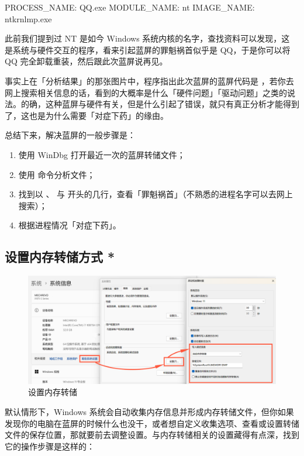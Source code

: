 \begin{MissingVerbatim}
PROCESS_NAME:  QQ.exe
MODULE_NAME: nt
IMAGE_NAME:  ntkrnlmp.exe
\end{MissingVerbatim}

此前我们提到过 NT 是如今 Windows 系统内核的名字，查找资料可以发现，这  是系统与硬件交互的程序，看来引起蓝屏的罪魁祸首似乎是 QQ，于是你可以将 QQ 完全卸载重装，然后跟此次蓝屏说再见。

事实上在「分析结果」的那张图片中，程序指出此次蓝屏的蓝屏代码是 ，若你去网上搜索相关信息的话，看到的大概率是什么「硬件问题」「驱动问题」之类的说法。的确，这种蓝屏与硬件有关，但是什么引起了错误，就只有真正分析才能得到了，这也是为什么需要「对症下药」的缘由。

总结下来，解决蓝屏的一般步骤是：

\begin{enumerate}
  \item 使用 WinDbg 打开最近一次的蓝屏转储文件；
  \item 使用  命令分析文件；
  \item 找到以 、 与  开头的几行，查看「罪魁祸首」（不熟悉的进程名字可以去网上搜索）；
  \item 根据进程情况「对症下药」。
\end{enumerate}

\subsection{设置内存转储方式 *}

\begin{figure}[htb!]
  \centering
  \includegraphics[width=.95\textwidth]{assets/advanced/Dump_Settings.png}
  \caption{设置内存转储}
  \label{fig:Dump_Settings}
\end{figure}

默认情形下，Windows 系统会自动收集内存信息并形成内存转储文件，但你如果发现你的电脑在蓝屏的时候什么也没干，或者想自定义收集选项、查看或设置转储文件的保存位置，那就要前去调整设置。与内存转储相关的设置藏得有点深，找到它的操作步骤是这样的：

